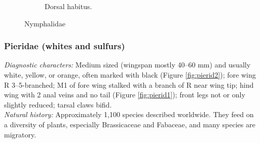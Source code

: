 \documentclass[letterpaper, 11pt]{article}
\begin{document}
\begin{figure}[ht!]
\begin{subfigure}[ht!]{0.38\textwidth}
        \caption{Dorsal habitus. \citep[Modified from Limenitis II in][]{bhlitem37427butt}}
        \label{fig:nymphalid3}
    \end{subfigure}
    \caption{Nymphalidae}\label{fig:nymphalids}
\end{figure}

\subsubsection{Pieridae (whites and sulfurs)}
\noindent{}\textit{Diagnostic characters:} Medium sized (wingspan mostly 40--60 mm) and usually white, yellow, or orange, often marked with black (Figure \ref{fig:pierid2}); fore wing R 3--5-branched; M1 of fore wing stalked with a branch of R near wing tip; hind wing with 2 anal veins and no tail (Figure \ref{fig:pierid1}); front legs not or only slightly reduced; tarsal claws bifid.\\

\noindent{}\textit{Natural history:} Approximately 1,100 species described worldwide. They feed on a diversity of plants, especially Brassicaceae and Fabaceae, and many species are migratory.
\end{document}
